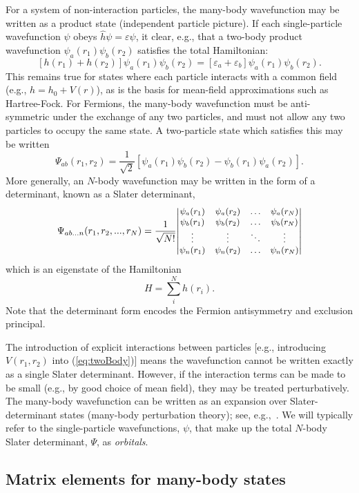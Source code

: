 \documentclass[10pt,twocolumn,a4paper]{article}%
\newcommand{\be}{\begin{equation}}
\newcommand{\ee}{\end{equation}}
\def\en{\ensuremath{\varepsilon}}
\begin{document}
For a system of non-interaction particles, the  many-body wavefunction may be written as a product state
(independent particle picture).
If each single-particle wavefunction $\psi$ obeys $\hat h\psi=\en\psi$, it clear, e.g., that a two-body product wavefunction $\psi_a(r_1)\psi_b(r_2)$ satisfies the total Hamiltonian:
\be\label{eq:twoBody}
\left[h(r_1)+h(r_2)\right]\psi_a(r_1)\psi_b(r_2) = \left[\en_a+\en_b\right]\psi_a(r_1)\psi_b(r_2).
\ee
This remains true for states where each particle interacts with a common field (e.g., $h = h_0 + V(r)$), as is the basis for mean-field approximations such as Hartree-Fock.
For Fermions, the many-body wavefunction must be anti-symmetric under the exchange of any two particles, and must not allow any two particles to occupy the same state.
A two-particle state which satisfies this may be written
\be
\Psi_{ab}(r_1, r_2) = \frac{1}{\sqrt{2}}\left[ \psi_a(r_1)\psi_b(r_2) - \psi_b(r_1)\psi_a(r_2) \right].
\ee
More generally, an $N$-body wavefunction may be written in the form of a determinant, known as a Slater determinant,
\be
\Psi_{ab...n}(r_1, r_2,..., r_N) =
\frac{1}{\sqrt{N!}} {\small\begin{vmatrix}
\psi_a(r_1) & \psi_a(r_2) & \ldots & \psi_a(r_N)\\
\psi_b(r_1) & \psi_b(r_2) & \ldots & \psi_b(r_N)\\
\vdots & \vdots & \ddots & \vdots \\
\psi_n(r_1) & \psi_n(r_2) & \ldots & \psi_n(r_N)
\end{vmatrix}}
\ee
which is an eigenstate of the Hamiltonian
\[
H = \sum_{i}^N h(r_i).
\]
Note that the determinant form encodes the Fermion antisymmetry and exclusion principal.

The introduction of explicit interactions between particles [e.g., introducing $V(r_1,r_2)$ into (\ref{eq:twoBody})] means the wavefunction cannot be written exactly as a single Slater determinant.
However, if the interaction terms can be made to be small (e.g., by good choice of mean field), they may be treated perturbatively.
The many-body wavefunction can be written as an expansion over Slater-determinant states (many-body perturbation theory); see, e.g.,~\cite{JohnsonBook2007,Lindgren1986}.
We will typically refer to the single-particle wavefunctions, $\psi$, that make up the total $N$-body Slater determinant, $\Psi$, as {\em orbitals}.

\subsection{Matrix elements for many-body states}
\end{document}
